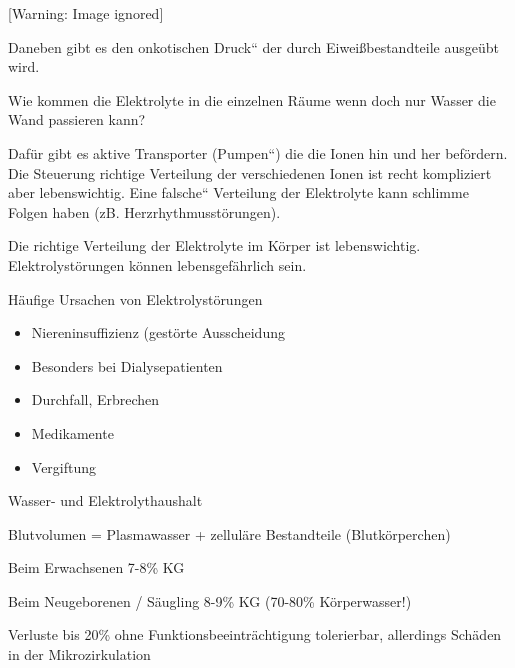 \documentclass{article}
\begin{document}
\begin{center}
 [Warning: Image ignored] %

\end{center}
Daneben gibt es den {\quotedblbase}onkotischen Druck{\textquotedblleft}
der durch Eiwei{\ss}bestandteile ausge\"ubt wird.

Wie kommen die Elektrolyte in die einzelnen R\"aume wenn doch nur Wasser
die Wand passieren kann?

Daf\"ur gibt es aktive Transporter
({\quotedblbase}Pumpen{\textquotedblleft}) die die Ionen hin und her
bef\"ordern. Die Steuerung richtige Verteilung der verschiedenen Ionen
ist recht kompliziert aber lebenswichtig. Eine
{\quotedblbase}falsche{\textquotedblleft} Verteilung der Elektrolyte
kann schlimme Folgen haben (zB. Herzrhythmusst\"orungen). 

Die richtige Verteilung der Elektrolyte im K\"orper ist lebenswichtig.
Elektrolyst\"orungen k\"onnen lebensgef\"ahrlich sein. 

H\"aufige Ursachen von Elektrolyst\"orungen

\begin{itemize}
\item Niereninsuffizienz (gest\"orte Ausscheidung

\end{itemize}
\begin{itemize}
\item Besonders bei Dialysepatienten

\end{itemize}
\begin{itemize}
\item Durchfall, Erbrechen 

\item Medikamente

\item Vergiftung

\end{itemize}
Wasser- und Elektrolythaushalt

Blutvolumen = Plasmawasser + zellul\"are Bestandteile (Blutk\"orperchen)

Beim Erwachsenen 7-8\% KG

Beim Neugeborenen / S\"augling 8-9\% KG  (70-80\%  K\"orperwasser!)

Verluste bis 20\% ohne Funktionsbeeintr\"achtigung tolerierbar,
allerdings Sch\"aden in der  Mikrozirkulation
\end{document}
